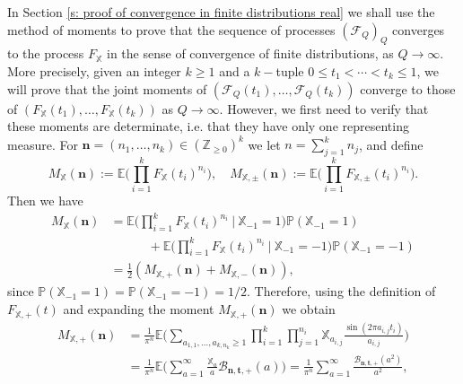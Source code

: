 \documentclass[JEP,XML,SOM,Unicode,NoFloatCountersInSection,published]{cedram}
\theoremstyle{plain}
\theoremstyle{definition}
\newcommand{\X}{\mathbb{X}}
\newcommand{\pr}{\mathbb{P}}
\begin{document}
\label{s: the limiting moment}
In Section \ref{s: proof of convergence in finite distributions real} we shall use the method of moments to prove that the sequence of processes $(\mathcal{F}_{Q})_Q$ converges to the process $F_{\X}$ in the sense of convergence of finite distributions, as $Q\to \infty$. More precisely, given an integer $k \geq 1$ and a $k-$tuple $0 \leq t_1 < \cdots < t_k \leq 1$, we will prove that the joint moments of $(\mathcal{F}_{Q}(t_1), \dots, \mathcal{F}_{Q}(t_k)) $
converge to those of $(F_{\X}(t_1), \dots, F_{\X}(t_k))$ as $Q\to \infty$. However, we first need to verify that these moments are determinate, i.e. that they have only one representing measure. For $\boldsymbol{n}=(n_1, \dots, n_k)\in (\mathbb{Z}_{\geq 0})^k$ we let $n= \sum_{j=1}^k n_j$, and define
\begin{equation}\label{eq: limiting moment}
M_{\X}(\boldsymbol{n}):= \mathbb{E}\biggl( \prod_{i = 1}^k F_{\X}(t_i)^{n_i} \biggr), \quad
M_{\X,\pm}(\boldsymbol{n}):= \mathbb{E}\biggl( \prod_{i = 1}^k F_{\X,\pm}(t_i)^{n_i} \biggr).
\end{equation}
Then we have
\begin{equation}\label{eq: MomentRandomPM}
\begin{aligned}
M_{\X}(\boldsymbol{n})&= \mathbb{E}\biggl( \prod_{i = 1}^k F_{\X}(t_i)^{n_i} \ \Big| \ \X_{-1}=1\biggr) \pr(\X_{-1}=1) \\
& \quad \quad \quad +\mathbb{E}\biggl( \prod_{i = 1}^k F_{\X}(t_i)^{n_i} \ \Big| \ \X_{-1}=-1\biggr) \pr(\X_{-1}=-1)\\
& =\frac{1}{2}\left(M_{\X,+}(\boldsymbol{n})+ M_{\X,-}(\boldsymbol{n})\right),
\end{aligned}
\end{equation}
since $\pr(\X_{-1}=1)= \pr(\X_{-1}=-1)=1/2.$
Therefore, using the definition of $F_{\X,+}(t)$ and expanding the moment $M_{\X,+}(\boldsymbol{n})$ we obtain
\begin{equation}\label{eq: FormulaMomentRandom+}
\begin{aligned}
M_{\X,+}(\boldsymbol{n}) &= \frac{1}{\pi^{n}} \mathbb{E} \biggl( \sum_{a_{1,1}, \dots, a_{k,n_k} \geq 1} \prod_{i = 1}^k \prod_{j = 1}^{n_i} \X_{a_{i,j}} \frac{\sin(2 \pi a_{i,j}t_i)}{a_{i,j}}\biggr)\\ & = \frac{1}{\pi^{n}} \mathbb{E} \biggl(\sum_{a=1}^{\infty} \frac{\X_a}{a}\mathcal{B}_{\boldsymbol{n},\mathbf{t}, +}(a)\biggr)= \frac{1}{\pi^{n}} \sum_{a=1}^{\infty} \frac{\mathcal{B}_{\boldsymbol{n},\mathbf{t}, +}(a^2)}{a^2},
\end{aligned}
\end{equation}
\end{document}
